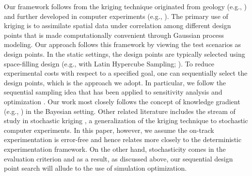 \documentclass{wscpaperproc}
\theoremstyle{wsc}
\begin{document}

Our framework follows from the kriging technique originated from geology (e.g., ) and further developed in computer experiments (e.g., ). The primary use of kriging is to assimilate spatial data under correlation among different design points that is made computationally convenient through Gaussian process modeling. Our approach follows this framework by viewing the test scenarios as design points. In the static settings, the design points are typically selected using space-filling design (e.g., with Latin Hypercube Sampling; ). To reduce experimental costs with respect to a specified goal, one can sequentially select the design points, which is the approach we adopt. In particular, we follow the sequential sampling idea that has been applied to sensitivity analysis and optimization \cite{kleijnen2004application,kleijnen2009kriging}. Our work most closely follows the concept of knowledge gradient (e.g., ) in the Bayesian setting. Other related literature includes the stream of study in stochastic kriging , a generalization of the kriging technique to stochastic computer experiments. In this paper, however, we assume the on-track experimentation is error-free and hence relates more closely to the deterministic experimentation framework. On the other hand, stochasticity comes in the evaluation criterion and as a result, as discussed above, our sequential design point search will allude to the use of simulation optimization. 
\end{document}
